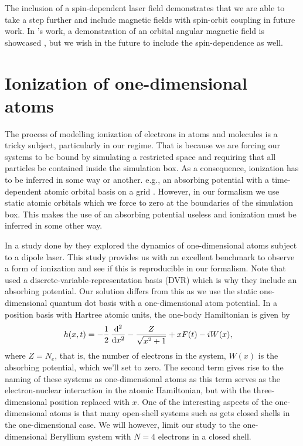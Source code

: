         The inclusion of a spin-dependent laser field demonstrates that we are
        able to take a step further and include magnetic fields with spin-orbit
        coupling in future work.
        In \citeauthor{greg-winther}'s work, a demonstration of an orbital
        angular magnetic field is showcased \cite{greg-winther}, but we wish in the future to
        include the spin-dependence as well.

    \section{Ionization of one-dimensional atoms}
        The process of modelling ionization of electrons in atoms and
        molecules is a tricky subject, particularly in our regime.
        That is because we are forcing our systems to be bound by simulating a
        restricted space and requiring that all particles be contained inside
        the simulation box.
        As a consequence, ionization has to be inferred in some way or another.
        e.g., an absorbing potential with a time-dependent atomic orbital basis
        on a grid \cite{kosloff1986363, miyagi_and_madsen, takeshi}.
        However, in our formalism we use static atomic orbitals which we
        force to zero at the boundaries of the simulation box.
        This makes the use of an absorbing potential useless and ionization
        must be inferred in some other way.

        In a study done by \citeauthor{miyagi_and_madsen}
        \cite{miyagi_and_madsen} they explored the dynamics of one-dimensional
        atoms subject to a dipole laser.
        This study provides us with an excellent benchmark to observe a form
        of ionization and see if this is reproducible in our formalism.
        Note that \citeauthor{miyagi_and_madsen} used a
        discrete-variable-representation basis (DVR) which is why they include
        an absorbing potential.
        Our solution differs from this as we use the static one-dimensional
        quantum dot basis with a one-dimensional atom potential.
        In a position basis with Hartree atomic units, the one-body
        Hamiltonian is given by \cite{miyagi_and_madsen}
        \begin{align}
            \oneten(x, t)
            &= -\half \dod[2]{}{x}
            - \frac{Z}{\sqrt{x^2 + 1}}
            + xF(t)
            - iW(x),
        \end{align}
        where $Z = N_e$, that is, the number of electrons in the system,
        $W(x)$ is the absorbing potential, which we'll set to zero.
        The second term gives rise to the naming of these systems as
        one-dimensional atoms as this term serves as the electron-nuclear
        interaction in the atomic Hamiltonian, but with the three-dimensional
        position replaced with $x$.
        One of the interesting aspects of the one-dimensional atoms is that many
        open-shell systems such as  gets closed shells in the
        one-dimensional case.
        We will however, limit our study to the one-dimensional Beryllium
        system with $N = 4$ electrons in a closed shell.

